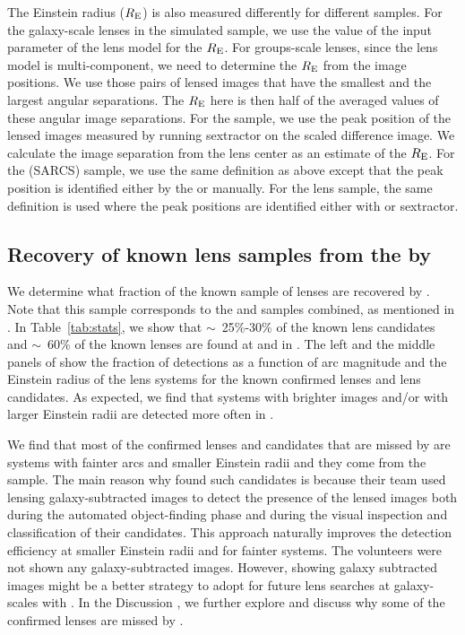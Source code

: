 \documentclass[useAMS,usenatbib,a4paper]{mn2e}
\begin{document}
The Einstein radius ($R_{\rm E}$) is also measured differently for
different samples. For the galaxy-scale lenses in the simulated sample,
we use the value of the input parameter of the lens model for the $R_{\rm E}$.
For groups-scale lenses, since the lens model is multi-component, we
need to determine the $R_{\rm E}$ from the image positions. We use those
pairs of lensed images that have the smallest and the largest angular
separations. The $R_{\rm E}$ here is then half of the averaged values of
these angular image separations. For the \rf sample, we use the peak
position of the lensed images measured by running {\sc sextractor} on
the scaled difference image. We calculate the image separation from the
lens center as an estimate of the $R_{\rm E}$. For the \af (SARCS)
sample, we use the same definition as above except that the peak
position is identified either by the \af or manually. For the \sw lens
sample, the same definition is used where the peak positions are
identified either with \af or {\sc sextractor}.



\subsection{Recovery of known lens samples from the \cfhtls by \sw}
\label{sec:results:known}

We determine what fraction of the known sample of lenses are recovered
by \sw. Note that this sample corresponds to the \rf and \af samples
combined, as mentioned in . In Table~\ref{tab:stats},
we show that $\sim$~25\%-30\% of the known lens candidates and
$\sim$~60\% of the known lenses are found at \StageOne and \StageTwo in
\sw. The left and the middle panels of  show the
fraction of detections as a function of arc magnitude and the Einstein
radius of the lens systems for the known confirmed lenses and lens
candidates. As expected, we find that systems with brighter images
and/or with larger Einstein radii are detected more often in \sw.

We find that most of the confirmed lenses and candidates that are missed
by \sw are systems with fainter arcs and smaller Einstein radii and they
come from the \rf sample. The main reason why \rf found such candidates
is because their team used lensing galaxy-subtracted images to detect
the presence of the lensed images both during the automated
object-finding phase and during the visual inspection and classification
of their candidates. This approach naturally improves the detection
efficiency at smaller Einstein radii and for fainter systems. The \sw
volunteers were not shown any galaxy-subtracted images. However, showing
galaxy subtracted images might be a better strategy to adopt for future
lens searches at galaxy-scales with \sw. In the Discussion
, we further explore and discuss why some of the confirmed
lenses are missed by \sw.
\end{document}
